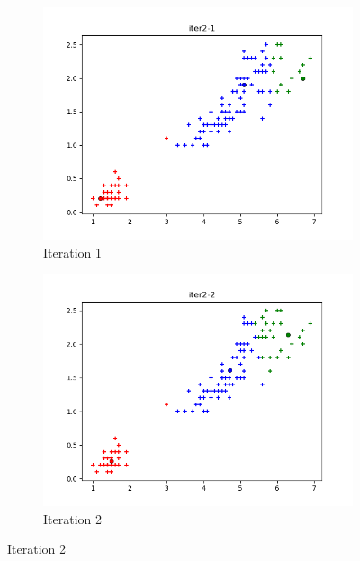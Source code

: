 \documentclass[french]{article}
\begin{document}
\begin{figure}[h!]
\centering
\begin{subfigure}{.5\textwidth}
  \centering
  \includegraphics[width=\linewidth]{img/iter2-1.png}
  \caption{Iteration 1}
\end{subfigure}%
\begin{subfigure}{.5\textwidth}
  \centering
  \includegraphics[width=\linewidth]{img/iter2-2.png}
  \caption{Iteration 2}
\end{subfigure}%
\end{figure}
\end{document}
